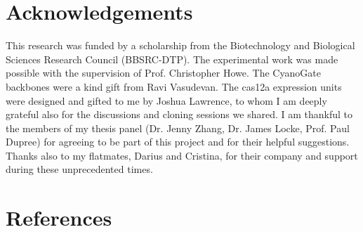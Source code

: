 \section*{Acknowledgements}
This research was funded by a scholarship from the Biotechnology and Biological Sciences Research Council (BBSRC-DTP). The experimental work was made possible with the supervision of Prof. Christopher Howe. The CyanoGate backbones were a kind gift from Ravi Vasudevan. The cas12a expression units were designed and gifted to me by Joshua Lawrence, to whom I am deeply grateful also for the discussions and cloning sessions we shared. I am thankful to the members of my thesis panel (Dr. Jenny Zhang, Dr. James Locke, Prof. Paul Dupree) for agreeing to be part of this project and for their helpful suggestions. Thanks also to my flatmates, Darius and Cristina, for their company and support during these unprecedented times. 

\newpage
\section*{References}


\newpage



